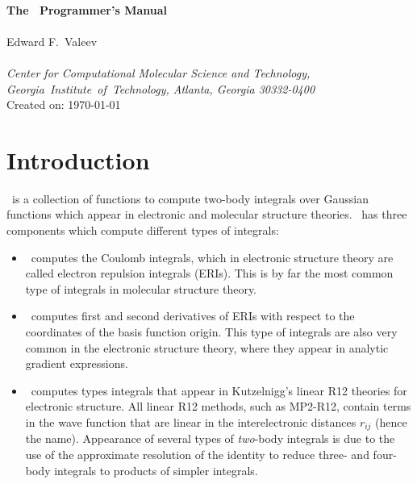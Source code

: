 \documentclass[12pt]{article}
\begin{document}


\begin{center}
\ \\
\vspace{2.0in}
{\bf {\Large The \LIBINT\ Programmer's Manual}} \\
\vspace{0.5in}
\LIBINTv \\
\vspace{0.5in}
Edward F.\ Valeev \\
\ \\
{\em Center for Computational Molecular Science and Technology, \mbox{Georgia
Institute of Technology,} Atlanta, Georgia 30332-0400}
\ \\
\vspace{0.3in}
Created on: \today
\end{center}

\thispagestyle{empty}

\newpage
\section{Introduction}
\LIBINT\ is a collection of functions to compute two-body integrals over Gaussian
functions which appear in electronic and molecular structure theories.
\LIBINTv \cite{Libint1}\ has three components which compute different types of integrals:

\begin{itemize}

\item \libint\ computes the Coulomb integrals, which in electronic structure theory
are called electron repulsion integrals (ERIs). This is by far the most common type of
integrals in molecular structure theory.

\item \libderiv\ computes first and second derivatives of ERIs with respect to the
coordinates of the basis function origin. This type of integrals are also very common
in the electronic structure theory, where they appear in analytic gradient expressions.

\item \librij\ computes types integrals that appear in Kutzelnigg's linear R12 theories
for electronic structure.\cite{Kutzelnigg85,Kutzelnigg91} All linear R12 methods, such as
MP2-R12, contain terms in the wave function that are linear in the interelectronic distances
$r_{ij}$ (hence the name). Appearance of several types of {\em two}-body integrals
is due to the use of the approximate resolution of the identity to reduce three- and four-body
integrals to products of simpler integrals.

\end{itemize}
\end{document}
